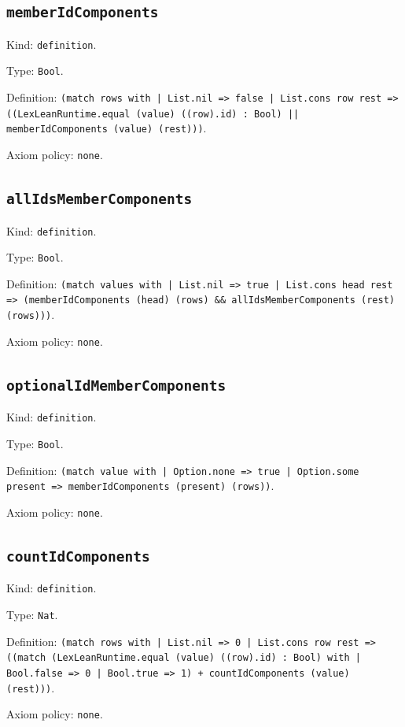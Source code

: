 \documentclass[11pt]{article}
\begin{document}
\subsection*{\texttt{memberIdComponents}}
\noindent Kind: \texttt{definition}.\par
\noindent Type: \texttt{Bool}.\par
\noindent Definition: \texttt{(match rows with | List.nil => false | List.cons row rest => ((LexLeanRuntime.equal (value) ((row).id) : Bool) || memberIdComponents (value) (rest)))}.\par
\noindent Axiom policy: \texttt{none}.\par
\subsection*{\texttt{allIdsMemberComponents}}
\noindent Kind: \texttt{definition}.\par
\noindent Type: \texttt{Bool}.\par
\noindent Definition: \texttt{(match values with | List.nil => true | List.cons head rest => (memberIdComponents (head) (rows) \&\& allIdsMemberComponents (rest) (rows)))}.\par
\noindent Axiom policy: \texttt{none}.\par
\subsection*{\texttt{optionalIdMemberComponents}}
\noindent Kind: \texttt{definition}.\par
\noindent Type: \texttt{Bool}.\par
\noindent Definition: \texttt{(match value with | Option.none => true | Option.some present => memberIdComponents (present) (rows))}.\par
\noindent Axiom policy: \texttt{none}.\par
\subsection*{\texttt{countIdComponents}}
\noindent Kind: \texttt{definition}.\par
\noindent Type: \texttt{Nat}.\par
\noindent Definition: \texttt{(match rows with | List.nil => 0 | List.cons row rest => ((match (LexLeanRuntime.equal (value) ((row).id) : Bool) with | Bool.false => 0 | Bool.true => 1) + countIdComponents (value) (rest)))}.\par
\noindent Axiom policy: \texttt{none}.\par
\end{document}
